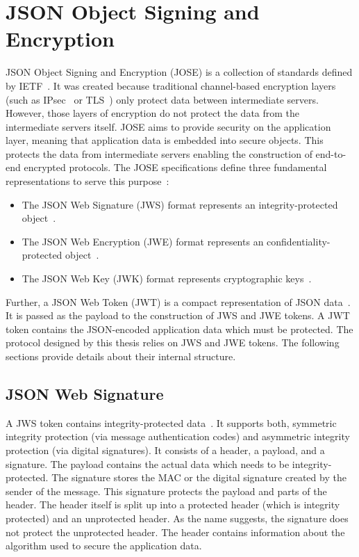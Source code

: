 \documentclass[../main.tex]{subfiles}
\begin{document}
\section{JSON Object Signing and Encryption}
\label{sec:jose}
JSON Object Signing and Encryption (JOSE) is a collection of standards defined by IETF~\cite{Barnes2014}.
It was created because traditional channel-based encryption layers (such as IPsec~\cite{IPSEC2011} or TLS~\cite{TLS2018}) only protect data between intermediate servers.
However, those layers of encryption do not protect the data from the intermediate servers itself.
JOSE aims to provide security on the application layer, meaning that application data is embedded into secure objects.
This protects the data from intermediate servers enabling the construction of end-to-end encrypted protocols.
The JOSE specifications define three fundamental representations to serve this purpose~\cite{Barnes2014}:
\begin{itemize}
    \item The JSON Web Signature (JWS) format represents an integrity-protected object~\cite{JWS2015}.
    \item The JSON Web Encryption (JWE) format represents an confidentiality-protected object~\cite{JWE2015}.
    \item The JSON Web Key (JWK) format represents cryptographic keys~\cite{JWK2015}.
\end{itemize}
Further, a JSON Web Token (JWT) is a compact representation of JSON data~\cite{JWT2015}.
It is passed as the payload to the construction of JWS and JWE tokens.
A JWT token contains the JSON-encoded application data which must be protected.
The protocol designed by this thesis relies on JWS and JWE tokens.
The following sections provide details about their internal structure.

\subsection{JSON Web Signature}
A JWS token contains integrity-protected data~\cite{JWS2015}.
It supports both, symmetric integrity protection (via message authentication codes) and asymmetric integrity protection (via digital signatures).
It consists of a header, a payload, and a signature.
The payload contains the actual data which needs to be integrity-protected.
The signature stores the MAC or the digital signature created by the sender of the message.
This signature protects the payload and parts of the header.
The header itself is split up into a protected header (which is integrity protected) and an unprotected header.
As the name suggests, the signature does not protect the unprotected header.
The header contains information about the algorithm used to secure the application data.
\end{document}
